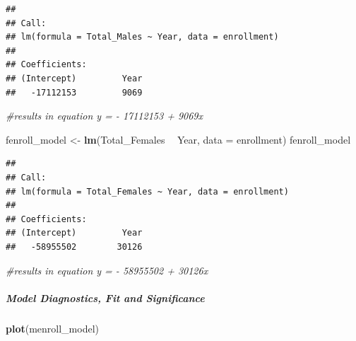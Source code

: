 \documentclass[]{article}
\newenvironment{Shaded}{\begin{snugshade}}{\end{snugshade}}
\newcommand{\KeywordTok}[1]{\textcolor[rgb]{0.13,0.29,0.53}{\textbf{#1}}}
\newcommand{\DataTypeTok}[1]{\textcolor[rgb]{0.13,0.29,0.53}{#1}}
\newcommand{\StringTok}[1]{\textcolor[rgb]{0.31,0.60,0.02}{#1}}
\newcommand{\CommentTok}[1]{\textcolor[rgb]{0.56,0.35,0.01}{\textit{#1}}}
\newcommand{\OperatorTok}[1]{\textcolor[rgb]{0.81,0.36,0.00}{\textbf{#1}}}
\newcommand{\NormalTok}[1]{#1}
\let\oldsubparagraph\subparagraph
\renewcommand{\subparagraph}[1]{\oldsubparagraph{#1}\mbox{}}
\begin{document}
\begin{verbatim}
## 
## Call:
## lm(formula = Total_Males ~ Year, data = enrollment)
## 
## Coefficients:
## (Intercept)         Year  
##   -17112153         9069
\end{verbatim}

\begin{Shaded}
\begin{Highlighting}[]
\CommentTok{#results in equation y = - 17112153 + 9069x}

\NormalTok{fenroll_model <-}\StringTok{ }\KeywordTok{lm}\NormalTok{(Total_Females }\OperatorTok{~}\StringTok{ }\NormalTok{Year, }\DataTypeTok{data =}\NormalTok{ enrollment)}
\NormalTok{fenroll_model}
\end{Highlighting}
\end{Shaded}

\begin{verbatim}
## 
## Call:
## lm(formula = Total_Females ~ Year, data = enrollment)
## 
## Coefficients:
## (Intercept)         Year  
##   -58955502        30126
\end{verbatim}

\begin{Shaded}
\begin{Highlighting}[]
\CommentTok{#results in equation y = - 58955502 + 30126x}
\end{Highlighting}
\end{Shaded}

\subparagraph{Model Diagnostics, Fit and
Significance}\label{model-diagnostics-fit-and-significance}

\begin{Shaded}
\begin{Highlighting}[]
\KeywordTok{plot}\NormalTok{(menroll_model)}
\end{Highlighting}
\end{Shaded}
\end{document}
